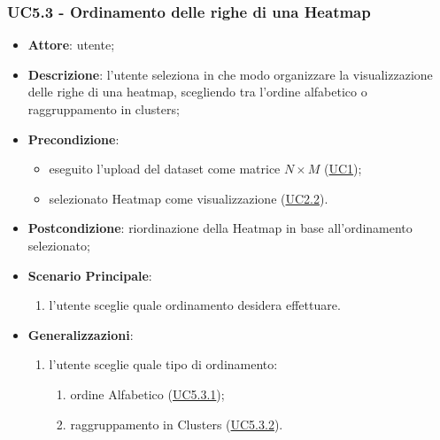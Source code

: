     \subsubsection{UC5.3 - Ordinamento delle righe di una Heatmap}
    \label{uc5.3}
    \begin{itemize}
    \item \textbf{Attore}: utente;
    \item \textbf{Descrizione}: l'utente seleziona in che modo organizzare la visualizzazione delle righe di una heatmap, scegliendo tra l'ordine alfabetico o raggruppamento in clusters;
    \item \textbf{Precondizione}: 
    \begin{itemize}
        \item eseguito l'upload del dataset come matrice $N\times M$ (\hyperref[uc1]{UC1});
        \item selezionato Heatmap come visualizzazione (\hyperref[uc2.2]{UC2.2}).
    \end{itemize}  
    \item \textbf{Postcondizione}: riordinazione della Heatmap in base all'ordinamento selezionato;
    \item \textbf{Scenario Principale}: 
    \begin{enumerate}
        \item l'utente sceglie quale ordinamento desidera effettuare.
    \end{enumerate}  
    \item \textbf{Generalizzazioni}: 
     \begin{enumerate}
            \item l'utente sceglie quale tipo di ordinamento:
                \begin{enumerate}
                    \item ordine Alfabetico (\hyperref[uc5.3.1]{UC5.3.1});
                    \item raggruppamento in Clusters (\hyperref[uc5.3.2]{UC5.3.2}).
                    \end{enumerate}
        \end{enumerate} 
    \end{itemize}
    
